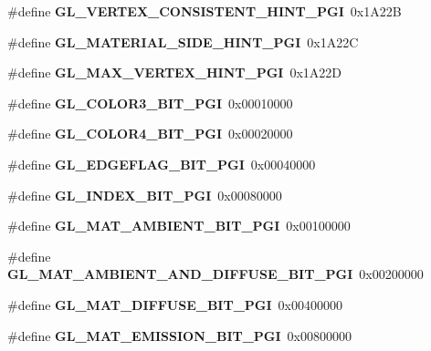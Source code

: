 \begin{DoxyCompactItemize}
\item 
\#define {\bfseries G\+L\+\_\+\+V\+E\+R\+T\+E\+X\+\_\+\+C\+O\+N\+S\+I\+S\+T\+E\+N\+T\+\_\+\+H\+I\+N\+T\+\_\+\+P\+G\+I}~0x1\+A22\+B\label{_s_d_l__opengl_8h_a157b78654bfcae5de6324740083fd6ef}

\item 
\#define {\bfseries G\+L\+\_\+\+M\+A\+T\+E\+R\+I\+A\+L\+\_\+\+S\+I\+D\+E\+\_\+\+H\+I\+N\+T\+\_\+\+P\+G\+I}~0x1\+A22\+C\label{_s_d_l__opengl_8h_a9efaf99547d4a3959209d17d0f4bb20a}

\item 
\#define {\bfseries G\+L\+\_\+\+M\+A\+X\+\_\+\+V\+E\+R\+T\+E\+X\+\_\+\+H\+I\+N\+T\+\_\+\+P\+G\+I}~0x1\+A22\+D\label{_s_d_l__opengl_8h_a84d0be5daf41950a078fd5a1dc632076}

\item 
\#define {\bfseries G\+L\+\_\+\+C\+O\+L\+O\+R3\+\_\+\+B\+I\+T\+\_\+\+P\+G\+I}~0x00010000\label{_s_d_l__opengl_8h_aa03dee77235d44438de5624dfd53c2b0}

\item 
\#define {\bfseries G\+L\+\_\+\+C\+O\+L\+O\+R4\+\_\+\+B\+I\+T\+\_\+\+P\+G\+I}~0x00020000\label{_s_d_l__opengl_8h_ace9811ca67aa25068b602bd63becdedc}

\item 
\#define {\bfseries G\+L\+\_\+\+E\+D\+G\+E\+F\+L\+A\+G\+\_\+\+B\+I\+T\+\_\+\+P\+G\+I}~0x00040000\label{_s_d_l__opengl_8h_a7cf113ae6ac0e2f2cd19ba18a64d03ea}

\item 
\#define {\bfseries G\+L\+\_\+\+I\+N\+D\+E\+X\+\_\+\+B\+I\+T\+\_\+\+P\+G\+I}~0x00080000\label{_s_d_l__opengl_8h_a73d1c369ecaf5cd3be043ea12438ec02}

\item 
\#define {\bfseries G\+L\+\_\+\+M\+A\+T\+\_\+\+A\+M\+B\+I\+E\+N\+T\+\_\+\+B\+I\+T\+\_\+\+P\+G\+I}~0x00100000\label{_s_d_l__opengl_8h_a6ec850f51c10198c9f309c3d8b9f7982}

\item 
\#define {\bfseries G\+L\+\_\+\+M\+A\+T\+\_\+\+A\+M\+B\+I\+E\+N\+T\+\_\+\+A\+N\+D\+\_\+\+D\+I\+F\+F\+U\+S\+E\+\_\+\+B\+I\+T\+\_\+\+P\+G\+I}~0x00200000\label{_s_d_l__opengl_8h_acc84e98e84fa424dc5cf6f6271066c5e}

\item 
\#define {\bfseries G\+L\+\_\+\+M\+A\+T\+\_\+\+D\+I\+F\+F\+U\+S\+E\+\_\+\+B\+I\+T\+\_\+\+P\+G\+I}~0x00400000\label{_s_d_l__opengl_8h_a42116e6cab70ff073fecc93b3f2af9dd}

\item 
\#define {\bfseries G\+L\+\_\+\+M\+A\+T\+\_\+\+E\+M\+I\+S\+S\+I\+O\+N\+\_\+\+B\+I\+T\+\_\+\+P\+G\+I}~0x00800000\label{_s_d_l__opengl_8h_a7f07172da246fa92788495c4a58a47d3}


\end{DoxyCompactItemize}
